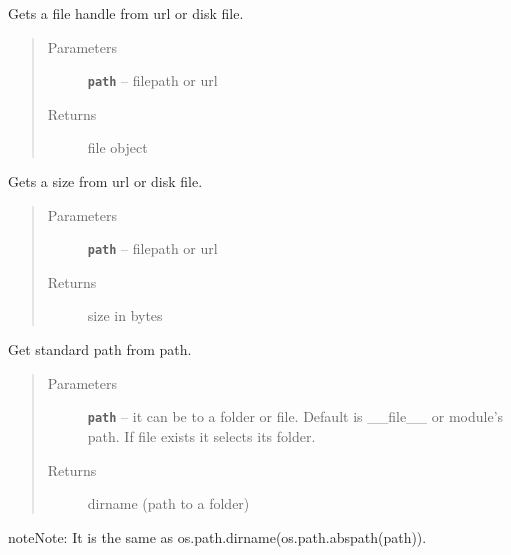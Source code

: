 \documentclass[letterpaper,10pt,english]{sphinxmanual}
\begin{document}

\begin{fulllineitems}
\label{RRtoolbox.lib:RRtoolbox.lib.directory.getFileHandle}
Gets a file handle from url or disk file.
\begin{quote}\begin{description}
\item[{Parameters}] \leavevmode
\textbf{\texttt{path}} -- filepath or url

\item[{Returns}] \leavevmode
file object

\end{description}\end{quote}

\end{fulllineitems}


\begin{fulllineitems}
\label{RRtoolbox.lib:RRtoolbox.lib.directory.getFileSize}
Gets a size from url or disk file.
\begin{quote}\begin{description}
\item[{Parameters}] \leavevmode
\textbf{\texttt{path}} -- filepath or url

\item[{Returns}] \leavevmode
size in bytes

\end{description}\end{quote}

\end{fulllineitems}


\begin{fulllineitems}
\label{RRtoolbox.lib:RRtoolbox.lib.directory.getPath}
Get standard path from path.
\begin{quote}\begin{description}
\item[{Parameters}] \leavevmode
\textbf{\texttt{path}} -- it can be to a folder or file. Default is \_\_file\_\_ or module's path.
If file exists it selects its folder.

\item[{Returns}] \leavevmode
dirname (path to a folder)

\end{description}\end{quote}

\begin{notice}{note}{Note:}
It is the same as os.path.dirname(os.path.abspath(path)).
\end{notice}

\end{fulllineitems}
\end{document}
